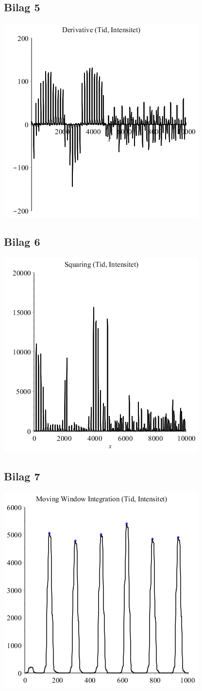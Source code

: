 \documentclass{article}
\begin{document}
\subsection*{Bilag 5}
\includegraphics[scale=0.6]{Filter3.png}
\subsection*{Bilag 6}
\includegraphics[scale=0.6]{Filter4.png}
\subsection*{Bilag 7}
\includegraphics[scale=0.6]{Filter5close2.png}
\end{document}
